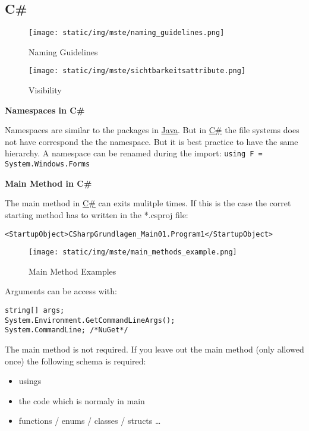 \documentclass[11pt,twoside,landscape]{article}
\begin{document}
\begin{multicols}{3}
\section{C\#}
\label{sec:org30188c9}

\begin{figure}[htbp]
\centering
\texttt{[image: static/img/mste/naming\_guidelines.png]}
\caption{\label{fig:org448645c}Naming Guidelines}
\end{figure}

\begin{figure}[htbp]
\centering
\texttt{[image: static/img/mste/sichtbarkeitsattribute.png]}
\caption{\label{fig:orgab88709}Visibility}
\end{figure}


\textbf{Namespaces in C\#}

Namespaces are similar to the packages in \href{../../../roam/20201116150053-java.org}{Java}.
But in \href{../../../roam/20211003114158-c.org}{C\#} the file systems does not have correspond the the namespace.
But it is best practice to have the same hierarchy.
A namespace can be renamed during the import: \texttt{using F = System.Windows.Forms}

\textbf{Main Method in C\#}

The main method in \href{../../../roam/20211003114158-c.org}{C\#} can exits mulitple times.
If this is the case the corret starting method has to written in the *.csproj file:

\lstset{language=XML,label= ,caption= ,captionpos=b,numbers=none}
\begin{lstlisting}
<StartupObject>CSharpGrundlagen_Main01.Program1</StartupObject>
\end{lstlisting}

\begin{figure}[htbp]
\centering
\texttt{[image: static/img/mste/main\_methods\_example.png]}
\caption{\label{fig:orgfb28141}Main Method Examples}
\end{figure}

Arguments can be access with:
\lstset{language=csharp,label= ,caption= ,captionpos=b,numbers=none}
\begin{lstlisting}
string[] args;
System.Environment.GetCommandLineArgs();
System.CommandLine; /*NuGet*/
\end{lstlisting}


The main method is not required.
If you leave out the main method (only allowed once) the following schema is required:
\begin{itemize}
\item usings
\item the code which is normaly in main
\item functions / enums / classes / structs \ldots{}
\end{itemize}



\end{multicols}
\end{document}
